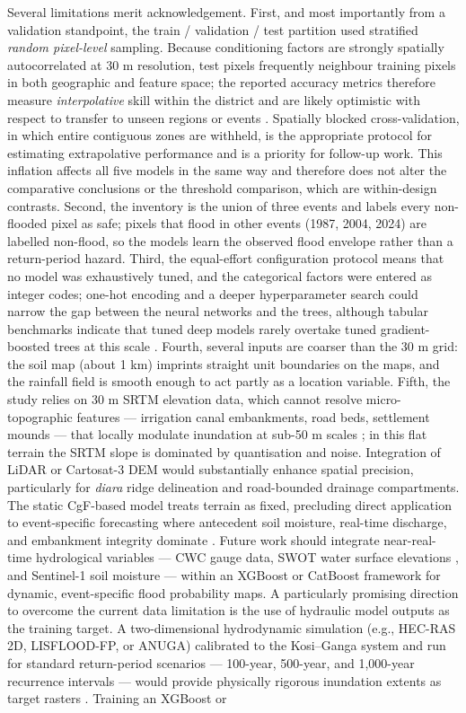 \documentclass[12pt, a4paper]{article}
\begin{document}
Several limitations merit acknowledgement. First, and most importantly from a validation standpoint, the train / validation / test partition used stratified \textit{random pixel-level} sampling. Because conditioning factors are strongly spatially autocorrelated at 30 m resolution, test pixels frequently neighbour training pixels in both geographic and feature space; the reported accuracy metrics therefore measure \textit{interpolative} skill within the district and are likely optimistic with respect to transfer to unseen regions or events \citep{roberts2017, ploton2020}. Spatially blocked cross-validation, in which entire contiguous zones are withheld, is the appropriate protocol for estimating extrapolative performance and is a priority for follow-up work. This inflation affects all five models in the same way and therefore does not alter the comparative conclusions or the threshold comparison, which are within-design contrasts. Second, the inventory is the union of three events and labels every non-flooded pixel as safe; pixels that flood in other events (1987, 2004, 2024) are labelled non-flood, so the models learn the observed flood envelope rather than a return-period hazard. Third, the equal-effort configuration protocol means that no model was exhaustively tuned, and the categorical factors were entered as integer codes; one-hot encoding and a deeper hyperparameter search could narrow the gap between the neural networks and the trees, although tabular benchmarks indicate that tuned deep models rarely overtake tuned gradient-boosted trees at this scale \citep{grinsztajn2022, shwartzziv2022, mcelfresh2023}. Fourth, several inputs are coarser than the 30 m grid: the soil map (about 1 km) imprints straight unit boundaries on the maps, and the rainfall field is smooth enough to act partly as a location variable. Fifth, the study relies on 30 m SRTM elevation data, which cannot resolve micro-topographic features --- irrigation canal embankments, road beds, settlement mounds --- that locally modulate inundation at sub-50 m scales \citep{neal2021, Hawker2022}; in this flat terrain the SRTM slope is dominated by quantisation and noise. Integration of LiDAR or Cartosat-3 DEM would substantially enhance spatial precision, particularly for \textit{diara} ridge delineation and road-bounded drainage compartments. The static CgF-based model treats terrain as fixed, precluding direct application to event-specific forecasting where antecedent soil moisture, real-time discharge, and embankment integrity dominate \citep{sinha2008, mishra2018}. Future work should integrate near-real-time hydrological variables --- CWC gauge data, SWOT water surface elevations \citep{Biancamaria2016}, and Sentinel-1 soil moisture --- within an XGBoost or CatBoost framework for dynamic, event-specific flood probability maps. A particularly promising direction to overcome the current data limitation is the use of hydraulic model outputs as the training target. A two-dimensional hydrodynamic simulation (e.g., HEC-RAS 2D, LISFLOOD-FP, or ANUGA) calibrated to the Kosi--Ganga system and run for standard return-period scenarios --- 100-year, 500-year, and 1,000-year recurrence intervals --- would provide physically rigorous inundation extents as target rasters \citep{teng2017, Bates2010}. Training an XGBoost or 
\end{document}
